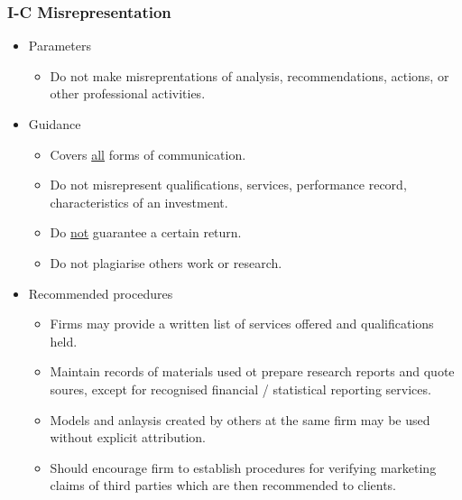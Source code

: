 \documentclass[../notes_compiled.tex]{subfiles}
\begin{document}
\subsubsection{I-C Misrepresentation}
\begin{itemize}
\item Parameters
\begin{itemize}
\item Do not make misreprentations of analysis, recommendations, actions, or other professional activities.
\end{itemize}
\item Guidance
\begin{itemize}
\item Covers \underline{all} forms of communication.
\item Do not misrepresent qualifications, services, performance record, characteristics of an investment.
\item Do \underline{not} guarantee a certain return.
\item Do not plagiarise others work or research.
\end{itemize}
\item Recommended procedures
\begin{itemize}
\item Firms may provide a written list of services offered and qualifications held.
\item Maintain records of materials used ot prepare research reports and quote soures, except for recognised financial / statistical reporting services.
\item Models and anlaysis created by others at the same firm may be used without explicit attribution.
\item Should encourage firm to establish procedures for verifying marketing claims of third parties which are then recommended to clients.
\end{itemize}
\end{itemize}
\end{document}
